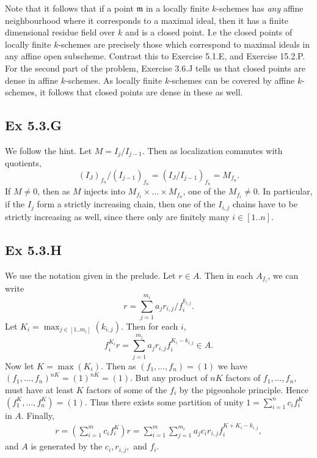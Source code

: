 \documentclass{article}
\theoremstyle{definition}
\begin{document}
Note that it follows that if a point $\mathfrak{m}$ in a locally finite
$k$-schemes has \emph{any} affine neighbourhood where it corresponds to a
maximal ideal, then it has a finite dimensional residue field over $k$ and is a
closed point. I.e the closed points of locally finite $k$-schemes are precisely
those which correspond to maximal ideals in any affine open subscheme. Contrast
this to Exercise 5.1.E, and Exercise 15.2.P. \\

For the second part of the problem, Exercise 3.6.J tells us that closed points
are dense in affine $k$-schemes. As locally finite $k$-schemes can be covered
by affine $k$-schemes, it follows that closed points are dense in these as
well.


\subsection*{Ex 5.3.G}

We follow the hint. Let $M = I_{j} / I_{j - 1}$. Then as localization commutes with quotients,
\begin{equation*}
	(I_{J})_{f_n} / (I_{j - 1})_{f_n}
	=
	(I_{J} / I_{j - 1})_{f_n}
	=
	M_{f_n}.
\end{equation*}
If $M \not = 0$, then as $M$ injects into $M_{f_1} \times \ldots \times
	M_{f_n}$, one of the $M_{f_i} \not = 0$. In particular, if the $I_j$ form a
strictly increasing chain, then one of the $I_{i, j}$ chains have to be
strictly increasing as well, since there only are finitely many $i \in [1..n]$.

\subsection*{Ex 5.3.H}

We use the notation given in the prelude. Let $r \in A$.
Then in each $A_{f_i}$, we can write
\[
	r
	=
	\sum_{j = 1}^{m_i} a_j r_{i, j}/f_{i}^{k_{i, j}}.
\]
Let $K_i = \max_{j \in [1..m_i]}(k_{i, j})$. Then for each $i$,
\[
	f_i^{K_i} r
	=
	\sum_{j = 1}^{m_i} a_j r_{i, j} f_i^{K_i - k_{i, j}}
	\in
	A.
\]
Now let $K = \max(K_i)$. Then as $(f_1, \ldots, f_n) = (1)$ we have $(f_1,
	\ldots, f_n)^{nK} = (1)^{nK} = (1)$. But any product of $nK$ factors of $f_1,
	\ldots, f_n$, must have at least $K$ factors of some of the $f_i$ by the
pigeonhole principle. Hence $(f_1^K, \ldots, f_n^K) = (1)$. Thus there exists
some partition of unity $1 = \sum_{i = 1}^{n} c_i f_i^K$ in $A$. Finally,
\begin{align*}
	r
	=
	\left(
	\sum_{i = 1}^{m}
	c_i f_i^K
	\right)
	r
	=
	\sum_{i = 1}^{m}
	\sum_{j = 1}^{m_i} a_j c_i r_{i, j} f_i^{K + K_i - k_{i, j}},
\end{align*}
and $A$ is generated by the $c_i, r_{i, j},$ and $f_i$.
\end{document}
